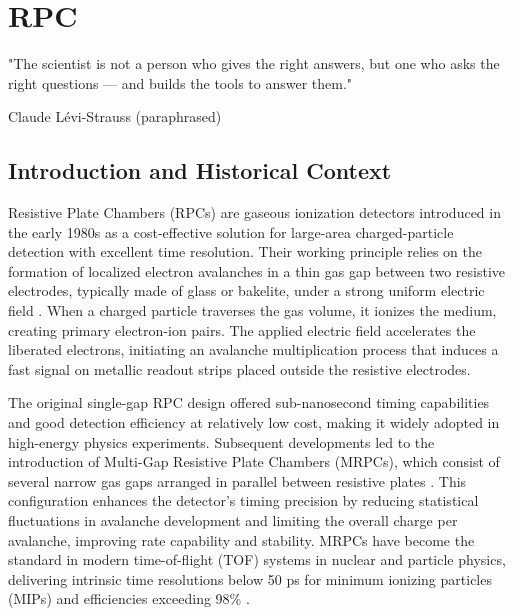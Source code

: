 
%

\chapter{RPC}
\label{cha:RPC}

\epigraph{
	"The scientist is not a person who gives the right answers, but one who asks the right questions — and builds the tools to answer them."
}{Claude Lévi-Strauss (paraphrased)}



\section{Introduction and Historical Context}

Resistive Plate Chambers (RPCs) are gaseous ionization detectors introduced in the early 1980s as a cost-effective solution for large-area charged-particle detection with excellent time resolution. Their working principle relies on the formation of localized electron avalanches in a thin gas gap between two resistive electrodes, typically made of glass or bakelite, under a strong uniform electric field \cite{riegler_physics_2004}. When a charged particle traverses the gas volume, it ionizes the medium, creating primary electron-ion pairs. The applied electric field accelerates the liberated electrons, initiating an avalanche multiplication process that induces a fast signal on metallic readout strips placed outside the resistive electrodes.

The original single-gap RPC design offered sub-nanosecond timing capabilities and good detection efficiency at relatively low cost, making it widely adopted in high-energy physics experiments. Subsequent developments led to the introduction of Multi-Gap Resistive Plate Chambers (MRPCs), which consist of several narrow gas gaps arranged in parallel between resistive plates \cite{riegler_physics_2004}. This configuration enhances the detector’s timing precision by reducing statistical fluctuations in avalanche development and limiting the overall charge per avalanche, improving rate capability and stability. MRPCs have become the standard in modern time-of-flight (TOF) systems in nuclear and particle physics, delivering intrinsic time resolutions below 50 ps for minimum ionizing particles (MIPs) and efficiencies exceeding 98\% \cite{blanco_ship_2020}.

